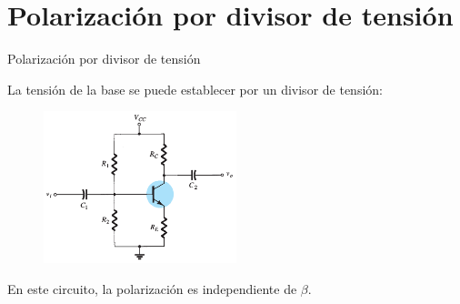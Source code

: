 \documentclass[t,aspectratio=169]{beamer}
\begin{document}
\section{Polarización por divisor de tensión}
\begin{frame}{Polarización por divisor de tensión}

La tensión de la base se puede establecer por un divisor de tensión:

\begin{figure}
    \centering
    \includegraphics[width=0.5\textwidth]{figures/polarizacion_divisor_tension.png}
\end{figure}

En este circuito, la polarización es independiente de $\beta$.


\end{frame}
\end{document}
